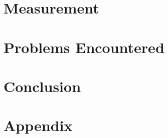 \documentclass[a4paper,12pt]{article}
\begin{document}
\section{Measurement}
\newpage
\section{Problems Encountered}
\newpage
\section{Conclusion}
\newpage
\section{Appendix}

\newpage
{}
\begin{flushleft}

\end{flushleft}
\end{document}
